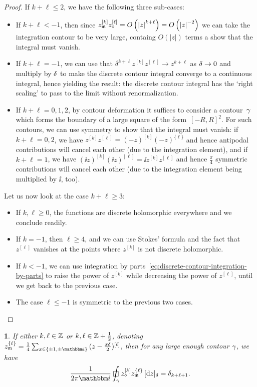 \documentclass[12pt,oneside,english]{amsart}
\numberwithin{equation}{section}
\numberwithin{figure}{section}
\theoremstyle{plain}
\theoremstyle{plain}
\theoremstyle{plain}
\theoremstyle{plain}
\newtheorem{lem}[thm]{\protect\lemmaname}
\theoremstyle{remark}
\theoremstyle{definition}
\theoremstyle{plain}
\theoremstyle{plain}
\numberwithin{thm}{section}
\providecommand{\lemmaname}{Lemma}
\providecommand{\lemmaname}{Lemma}
\providecommand{\lemmaname}{Lemma}
\providecommand{\lemmaname}{Lemma}
\begin{document}
\begin{proof}
If $k+\ell\leq2$, we have the following three sub-cases: 
\begin{itemize}
\item If $k+\ell<-1$, then since 
$z_{\mathfrak{m}}^{\left[k\right]}z_{\diamond}^{\left[\ell\right]}
=O\left(\left|z\right|^{k+\ell}\right)=O\left(\left|z\right|^{-2}\right)$
we can take the integration contour to be very large, containg 
$O\left(\left|z\right|\right)$
terms a show that the integral must vanish. 
\item If $k+\ell=-1$, we can use that 
$\delta^{k+\ell}z^{\left[k\right]}z^{\left[\ell\right]} \to  z^{k+\ell}$
as ${\delta} \to 0$ and multiply by ${\delta}$ to make the discrete contour
integral converge to a continuous integral, hence yielding the result:
the discrete contour integral has the `right scaling' to pass to the
limit without renormalization. 
\item If $k+\ell=0,1,2$, 
by contour deformation it suffices to consider a contour~$\gamma$ 
which forms the boundary of a large square of the 
form~$\left[-R,R\right]^{2}$. For such contours, we can use symmetry to show 
that
the integral must vanish: if $k+\ell=0,2$, we have 
$z^{\left[k\right]}z^{\left[\ell\right]}=\left(-z\right)^{\left[k\right]}
\left(-z\right)^{\{\ell\}}$
and hence antipodal contributions will cancel each other (due to the
integration element), and if $k+\ell=1$, we have 
$\left(\ii z\right)^{\left[k\right]}\left(\ii z\right)^{\left[\ell\right]}
=\ii z^{\left[ k\right]}z^{\left[\ell\right]}$
and hence $\frac{\pi}{4}$ symmetric contributions will cancel each
other (due to the integration element being multiplied by $\ii$, too). 
\end{itemize}
Let us now look at the case $k+\ell\geq3$: 
\begin{itemize}
\item If $k,\ell\geq0$, the functions are discrete holomorphic everywhere
and we conclude readily. 
\item If $k=-1$, then $\ell\geq4$, and we can use
Stokes' formula and the fact that $z^{\left[\ell\right]}$
vanishes at the points where $z^{\left[k\right]}$ is not discrete
holomorphic. 
\item If $k<-1$, we can use integration by 
parts~\eqref{eq:discrete-contour-integration-by-parts} to raise the power of 
$z^{\left[k\right]}$
while decreasing the power of $z^{\left[\ell\right]}$, until we get
back to the previous case. 
\item The case $\ell\leq-1$ is symmetric to the previous two cases. 
\end{itemize}
\end{proof}
\begin{lem}
\label{lem:ising-contour-integral}If either $k,\ell\in\mathbb{Z} $
or $k,\ell\in\mathbb{Z} +\frac{1}{2}$, denoting 
$\dmonavg{z_{\mdl}}{\ell} 
= \frac{1}{4}\sum_{x\in\left\{ \pm1,\pm \ii \right\}} 
\dmon{ ( z-\frac{x\meshsz}{2} )}{\ell}$,
then for any large enough contour $\gamma$, we have 
\[
\frac{1}{2\pi \ii}
\dcint{\contour}
  \dmon{z_{\dmd}}{k} \dmonavg{z_{\mdl}}{\ell} \, \dd{z}
= \delta_{k+\ell+1}.
\]
\end{lem}
\end{document}
